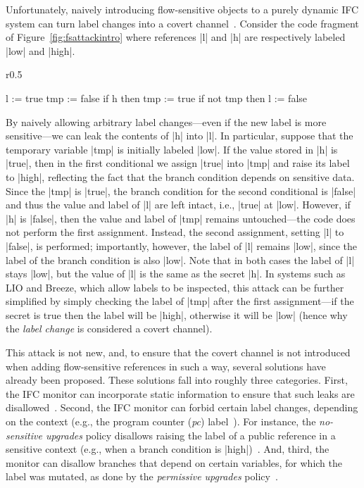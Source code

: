 Unfortunately, naively introducing flow-sensitive objects to a purely dynamic
IFC system can turn label changes into a covert channel~\cite{Russo:2010}. 
%
Consider the code fragment of Figure~\ref{fig:fsattackintro}
where references |l| and |h| are respectively labeled |low| and
|high|.
%
\begin{wrapfigure}{r}{0.5\columnwidth}
  \small
\begin{code}
l    := true
tmp  := false
if h then tmp := true
if not tmp then l := false
\end{code}
\vspace{-15pt}
\caption{\small\label{fig:fsattackintro} Flow-sensitive attack}
\end{wrapfigure}
%
By naively allowing arbitrary label changes---even if the new label is
more sensitive---we can leak the contents of |h| into |l|.
%
In particular, suppose that the temporary variable |tmp| is initially
labeled |low|.
%
If the value stored in |h| is |true|, then in the first conditional we
assign |true| into |tmp| and raise its label to |high|, reflecting the
fact that the branch condition depends on sensitive data.
%
Since the |tmp| is |true|, the branch condition for the second conditional is
|false| and thus the value and label of |l| are left intact, i.e., |true| at
|low|.
%
However, if |h| is |false|, then the value and label of |tmp| remains
untouched---the code does not perform the first assignment.
%
Instead, the second assignment, setting |l| to |false|, is performed;
importantly, however, the label of |l| remains |low|, since the label of the
branch condition is also |low|.
%
Note that in both cases the label of |l| stays |low|, but the value of |l| is
the same as the secret |h|.
%
In systems such as LIO and Breeze, which allow labels to be inspected, this
attack can be further simplified by simply checking the label of |tmp| after
the first assignment---if the secret is true then the label will be |high|,
otherwise it will be |low| (hence why the \emph{label change} is considered a
covert channel).

This attack is not new, and, to ensure that the covert channel is
not introduced when adding flow-sensitive references in such a way,
several solutions have already been proposed. 
%
These solutions fall into roughly three categories.
%
First, the IFC monitor can incorporate static information to ensure that such
leaks are disallowed~\cite{Russo:2010}.
%
Second, the IFC monitor can forbid certain label changes, depending on the
context (e.g., the program counter (\emph{pc})
label~\cite{sabelfeld:language-based-iflow}).
%
For instance, the \emph{no-sensitive upgrades} policy disallows raising the
label of a public reference in a sensitive context (e.g., when a branch
condition is |high|)~\cite{Zdancewic02programminglanguages,
Austin:Flanagan:PLAS09}.
%
And, third, the monitor can disallow branches that depend on certain variables,
for which the label was mutated, as done by the \emph{permissive upgrades}
policy~\cite{Austin:Flanagan:PLAS10}.

